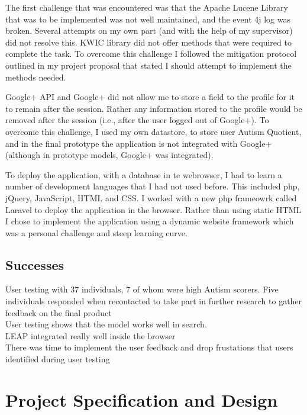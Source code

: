 \documentclass[a4paper, 11pt]{article}
\begin{document}
\vspace{5mm}
The first challenge that was encountered was that the Apache Lucene Library that was to be implemented was not well maintained, and the event 4j log was broken. Several attempts on my own part (and with the help of my supervisor) did not resolve this. KWIC library did not offer methods that were required to complete the task. To overcome this challenge I followed the mitigation protocol outlined in my project proposal that stated I should attempt to implement the methods needed. 

\vspace{5mm}
Google+ API and Google+ did not allow me to store a field to the profile for it to remain after the session. Rather any information stored to the profile would be removed after the session (i.e., after the user logged out of Google+). To overcome this challenge, I used my own datastore, to store user Autism Quotient, and in the final prototype the application is not integrated with Google+ (although in prototype models, Google+ was integrated).

\vspace{5mm}
To deploy the application, with a database in te webrowser, I had to learn a number of development languages that I had not used before. This included php, jQuery, JavaScript, HTML and CSS. I worked with a new php frameowrk called Laravel to deploy the application in the browser. Rather than using static HTML I chose to implement the application using a dynamic website framework which was a personal challenge and steep learning curve. 

\subsection{Successes}
User testing with 37 individuals, 7 of whom were high Autism scorers. Five individuals responded when recontacted to take part in further research to gather feedback on the final product\\
User testing shows that the model works well in search.\\
LEAP integrated really well inside the browser\\
There was time to implement the user feedback and drop frustations that users identified during user testing\\


\section{Project Specification and Design} 
\end{document}
